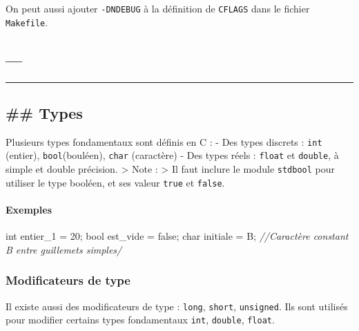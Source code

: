 \documentclass[11pt]{article}
\newenvironment{Shaded}{}{}
\newcommand{\DataTypeTok}[1]{\textcolor[rgb]{0.56,0.13,0.00}{{#1}}}
\newcommand{\DecValTok}[1]{\textcolor[rgb]{0.25,0.63,0.44}{{#1}}}
\newcommand{\CharTok}[1]{\textcolor[rgb]{0.25,0.44,0.63}{{#1}}}
\newcommand{\CommentTok}[1]{\textcolor[rgb]{0.38,0.63,0.69}{\textit{{#1}}}}
\newcommand{\NormalTok}[1]{{#1}}
\begin{document}
On peut aussi ajouter \texttt{-DNDEBUG} à la définition de
\texttt{CFLAGS} dans le fichier \texttt{Makefile}.

    \hypertarget{section}{%
\subsection{---}\label{section}}

\begin{center}\rule{0.5\linewidth}{0.5pt}\end{center}

    \hypertarget{types}{%
\subsection{\#\# Types}\label{types}}

    Plusieurs types fondamentaux sont définis en C : - Des types discrets :
\texttt{int} (entier), \texttt{bool}(bouléen), \texttt{char} (caractère)
- Des types réels : \texttt{float} et \texttt{double}, à simple et
double précision. \textgreater{} Note : \textgreater{} Il faut inclure
le module \texttt{stdbool} pour utiliser le type booléen, et ses valeur
\texttt{true} et \texttt{false}.

\hypertarget{exemples}{%
\paragraph{Exemples}\label{exemples}}

\begin{Shaded}
\begin{Highlighting}[]
\DataTypeTok{int}\NormalTok{ entier\_1 = }\DecValTok{20}\NormalTok{;}
\DataTypeTok{bool}\NormalTok{ est\_vide = false;}
\DataTypeTok{char}\NormalTok{ initiale = }\CharTok{\textquotesingle{}B\textquotesingle{}}\NormalTok{; }\CommentTok{//Caractère constant \textquotesingle{}B\textquotesingle{} entre guillemets simples/ }
\end{Highlighting}
\end{Shaded}

\hypertarget{modificateurs-de-type}{%
\subsubsection{Modificateurs de type}\label{modificateurs-de-type}}

Il existe aussi des modificateurs de type : \texttt{long},
\texttt{short}, \texttt{unsigned}. Ils sont utilisés pour modifier
certains types fondamentaux \texttt{int}, \texttt{double},
\texttt{float}.
\end{document}
